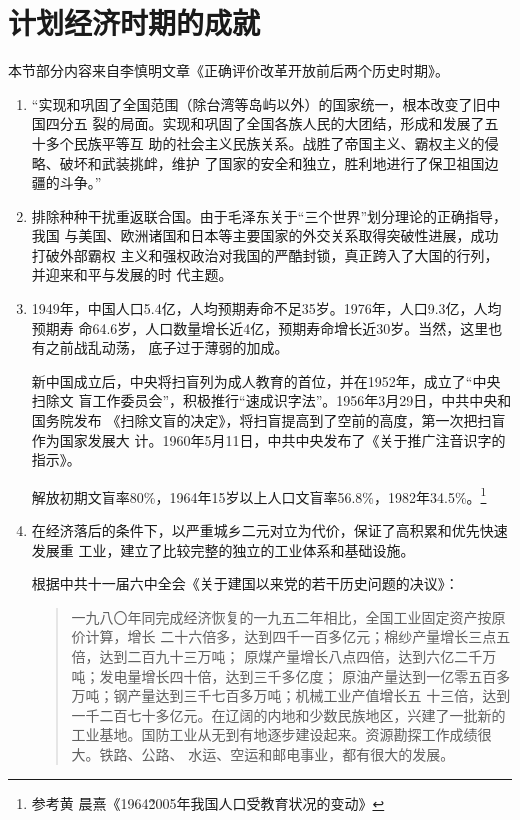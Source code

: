 \section{计划经济时期的成就}

本节部分内容来自李慎明文章《正确评价改革开放前后两个历史时期》。

\begin{enumerate}

\item “实现和巩固了全国范围（除台湾等岛屿以外）的国家统一，根本改变了旧中国四分五
  裂的局面。实现和巩固了全国各族人民的大团结，形成和发展了五十多个民族平等互
  助的社会主义民族关系。战胜了帝国主义、霸权主义的侵略、破坏和武装挑衅，维护
  了国家的安全和独立，胜利地进行了保卫祖国边疆的斗争。”

\item 排除种种干扰重返联合国。由于毛泽东关于“三个世界”划分理论的正确指导，我国
  与美国、欧洲诸国和日本等主要国家的外交关系取得突破性进展，成功打破外部霸权
  主义和强权政治对我国的严酷封锁，真正跨入了大国的行列，并迎来和平与发展的时
  代主题。

\item 1949年，中国人口5.4亿，人均预期寿命不足35岁。1976年，人口9.3亿，人均预期寿
  命64.6岁，人口数量增长近4亿，预期寿命增长近30岁。当然，这里也有之前战乱动荡，
  底子过于薄弱的加成。

  新中国成立后，中央将扫盲列为成人教育的首位，并在1952年，成立了“中央扫除文
  盲工作委员会”，积极推行“速成识字法”。1956年3月29日，中共中央和国务院发布
  《扫除文盲的决定》，将扫盲提高到了空前的高度，第一次把扫盲作为国家发展大
  计。1960年5月11日，中共中央发布了《关于推广注音识字的指示》。

  解放初期文盲率80\%，1964年15岁以上人口文盲率56.8\%，1982年34.5\%。\footnote{参考黄
    晨熹《1964\~2005年我国人口受教育状况的变动》}

\item 在经济落后的条件下，以严重城乡二元对立为代价，保证了高积累和优先快速发展重
  工业，建立了比较完整的独立的工业体系和基础设施。

  根据中共十一届六中全会《关于建国以来党的若干历史问题的决议》：
  \begin{quotation}
    一九八〇年同完成经济恢复的一九五二年相比，全国工业固定资产按原价计算，增长
    二十六倍多，达到四千一百多亿元；棉纱产量增长三点五倍，达到二百九十三万吨；
    原煤产量增长八点四倍，达到六亿二千万吨；发电量增长四十倍，达到三千多亿度；
    原油产量达到一亿零五百多万吨；钢产量达到三千七百多万吨；机械工业产值增长五
    十三倍，达到一千二百七十多亿元。在辽阔的内地和少数民族地区，兴建了一批新的
    工业基地。国防工业从无到有地逐步建设起来。资源勘探工作成绩很大。铁路、公路、
    水运、空运和邮电事业，都有很大的发展。


\end{quotation}
\end{enumerate}
